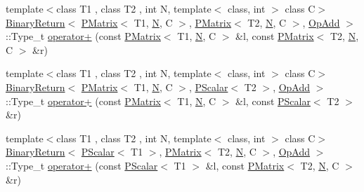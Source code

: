 \begin{DoxyCompactItemize}
{\footnotesize template$<$class T1 , class T2 , int N, template$<$ class, int $>$ class C$>$ }\\\mbox{\hyperlink{structENSEM_1_1BinaryReturn}{Binary\+Return}}$<$ \mbox{\hyperlink{classENSEM_1_1PMatrix}{P\+Matrix}}$<$ T1, \mbox{\hyperlink{operator__name__util_8cc_a7722c8ecbb62d99aee7ce68b1752f337}{N}}, C $>$, \mbox{\hyperlink{classENSEM_1_1PMatrix}{P\+Matrix}}$<$ T2, \mbox{\hyperlink{operator__name__util_8cc_a7722c8ecbb62d99aee7ce68b1752f337}{N}}, C $>$, \mbox{\hyperlink{structENSEM_1_1OpAdd}{Op\+Add}} $>$\+::Type\+\_\+t \mbox{\hyperlink{group__primmatrix_ga14b22344862e687608f50a8386764f6d}{operator+}} (const \mbox{\hyperlink{classENSEM_1_1PMatrix}{P\+Matrix}}$<$ T1, \mbox{\hyperlink{operator__name__util_8cc_a7722c8ecbb62d99aee7ce68b1752f337}{N}}, C $>$ \&l, const \mbox{\hyperlink{classENSEM_1_1PMatrix}{P\+Matrix}}$<$ T2, \mbox{\hyperlink{operator__name__util_8cc_a7722c8ecbb62d99aee7ce68b1752f337}{N}}, C $>$ \&r)
\item 
{\footnotesize template$<$class T1 , class T2 , int N, template$<$ class, int $>$ class C$>$ }\\\mbox{\hyperlink{structENSEM_1_1BinaryReturn}{Binary\+Return}}$<$ \mbox{\hyperlink{classENSEM_1_1PMatrix}{P\+Matrix}}$<$ T1, \mbox{\hyperlink{operator__name__util_8cc_a7722c8ecbb62d99aee7ce68b1752f337}{N}}, C $>$, \mbox{\hyperlink{classENSEM_1_1PScalar}{P\+Scalar}}$<$ T2 $>$, \mbox{\hyperlink{structENSEM_1_1OpAdd}{Op\+Add}} $>$\+::Type\+\_\+t \mbox{\hyperlink{group__primmatrix_gacd1e2ab4740e640c1aa2862faf4436db}{operator+}} (const \mbox{\hyperlink{classENSEM_1_1PMatrix}{P\+Matrix}}$<$ T1, \mbox{\hyperlink{operator__name__util_8cc_a7722c8ecbb62d99aee7ce68b1752f337}{N}}, C $>$ \&l, const \mbox{\hyperlink{classENSEM_1_1PScalar}{P\+Scalar}}$<$ T2 $>$ \&r)
\item 
{\footnotesize template$<$class T1 , class T2 , int N, template$<$ class, int $>$ class C$>$ }\\\mbox{\hyperlink{structENSEM_1_1BinaryReturn}{Binary\+Return}}$<$ \mbox{\hyperlink{classENSEM_1_1PScalar}{P\+Scalar}}$<$ T1 $>$, \mbox{\hyperlink{classENSEM_1_1PMatrix}{P\+Matrix}}$<$ T2, \mbox{\hyperlink{operator__name__util_8cc_a7722c8ecbb62d99aee7ce68b1752f337}{N}}, C $>$, \mbox{\hyperlink{structENSEM_1_1OpAdd}{Op\+Add}} $>$\+::Type\+\_\+t \mbox{\hyperlink{group__primmatrix_ga39561cdaedaf3bb4fb108575dae42de6}{operator+}} (const \mbox{\hyperlink{classENSEM_1_1PScalar}{P\+Scalar}}$<$ T1 $>$ \&l, const \mbox{\hyperlink{classENSEM_1_1PMatrix}{P\+Matrix}}$<$ T2, \mbox{\hyperlink{operator__name__util_8cc_a7722c8ecbb62d99aee7ce68b1752f337}{N}}, C $>$ \&r)

\end{DoxyCompactItemize}
